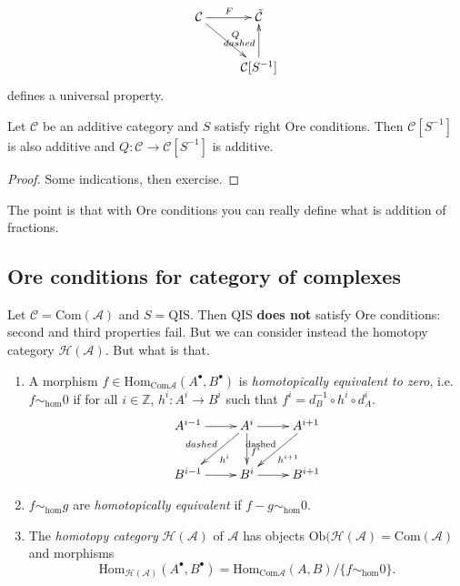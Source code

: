$$
\xymatrix{
\mathcal{C}\ar[r]^{F}\ar[dr]^{Q}&  \tilde{\mathcal{C}}\\
&\mathcal{C}[S^{-1}]\ar[u]^{dashed}
}
$$
defines a universal property.

\begin{proposition}
\label{proposition-Ore-conditions}
Let $\mathcal{C}$ be an additive category and $S$ satisfy right Ore conditions.
Then $\mathcal{C}[S^{-1}]$ is also additive and $Q:\mathcal{C} \to
\mathcal{C}[S^{-1}]$ is additive.
\end{proposition}

\begin{proof}
Some indications, then exercise.
\end{proof}

The point is that with Ore conditions you can really define what is addition of
fractions.

\subsection*{Ore conditions for category of complexes}
\label{subsection-Ore-conditions-for-category-of-complexes}

Let $\mathcal{C}=\text{Com}(\mathcal{A})$ and $S=\text{QIS}$. Then QIS {\bf does
not} satisfy Ore conditions: second and third properties fail. But we can
consider instead the homotopy category $\mathcal{H}(\mathcal{A})$. But what is 
that.

\begin{definition}
\label{definition-homotopy-category}
\begin{enumerate}
\item 
A morphism $f \in \text{Hom}_{\text{Com}\mathcal{A}}(A^{\bullet},B^{\bullet})$
is {\it homotopically equivalent to zero}, i.e. $f \sim_{\text{hom}}0$ if for
all $i\in \mathbb{Z}$, $h^i:A^i \to B^i$ such that 
$f^i=d_B^{-1}\circ h^i \circ d_A^i$.
$$
\xymatrix{
A^{i-1}\ar[r]&
A^{i}\ar[r]\ar[dl]_{dashed}^{h^i}\ar[d]^{f^i}&
A^{i+1}\ar[dl]_{\text{dashed}}^{h^{i+1}}\\
B^{i-1}\ar[r]& B^i\ar[r]& B^{i+1}
}
$$
\item $f\sim_{\text{hom}}g$ are {\it homotopically equivalent} if $f-g
\sim_{\text{hom}}0$.
\item The {\it homotopy category}  $\mathcal{H}(\mathcal{A})$ of $\mathcal{A}$
has objects $\text{Ob}(\mathcal{H}(\mathcal{A})=\text{Com}(\mathcal{A})$ and
morphisms
$$
\text{Hom}_{\mathcal{H}(\mathcal{A})}(A^{\bullet},B^{\bullet})
=\text{Hom}_{\text{Com}\mathcal{A}}(A,B )\Big/\{f\sim_{\text{hom}}0\}.
$$
\end{enumerate}
\end{definition}

